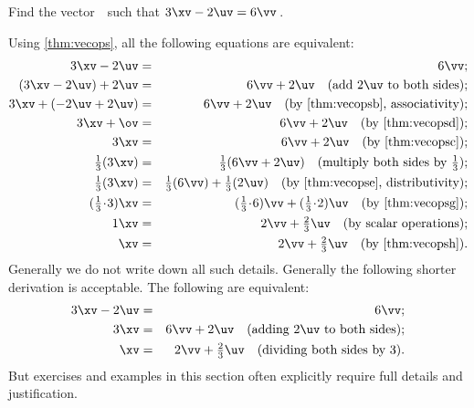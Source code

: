 \begin{example} \label{eg:}
Find the vector~\xv\ such that \(3\xv-2\uv=6\vv\)\,.
\begin{solution} 
Using \autoref{thm:vecops}, all the following equations are equivalent:
\begin{eqnarray*}
3\xv-2\uv&=&6\vv
;\\
(3\xv-2\uv)+2\uv&=&6\vv+2\uv
\quad(\text{add \(2\uv\) to both sides});\\
3\xv+(-2\uv+2\uv)&=&6\vv+2\uv
\quad(\text{by \ref{thm:vecopsb}, associativity});\\
3\xv+\ov&=&6\vv+2\uv
\quad(\text{by \ref{thm:vecopsd}});\\
3\xv&=&6\vv+2\uv
\quad(\text{by \ref{thm:vecopsc}});\\
\tfrac13(3\xv)&=&\tfrac13(6\vv+2\uv)
\quad(\text{multiply both sides by }\tfrac13);\\
\tfrac13(3\xv)&=&\tfrac13(6\vv)+\tfrac13(2\uv)
\quad(\text{by \ref{thm:vecopse}, distributivity});\\
(\tfrac13\cdot3)\xv&=&(\tfrac13\cdot6)\vv+(\tfrac13\cdot2)\uv
\quad(\text{by \ref{thm:vecopsg}});\\
1\xv&=&2\vv+\tfrac23\uv
\quad(\text{by scalar operations});\\
\xv&=&2\vv+\tfrac23\uv
\quad(\text{by \ref{thm:vecopsh}}).
\end{eqnarray*}
Generally we do not write down all such details.
Generally the following shorter derivation is acceptable.
The following are equivalent:
\begin{eqnarray*}
3\xv-2\uv&=&6\vv
;\\
3\xv&=&6\vv+2\uv
\quad(\text{adding \(2\uv\) to both sides});\\
\xv&=&2\vv+\tfrac23\uv
\quad(\text{dividing both sides by }3).
\end{eqnarray*}
But exercises and examples in this section often explicitly require full details and justification.
\end{solution}
\end{example}




